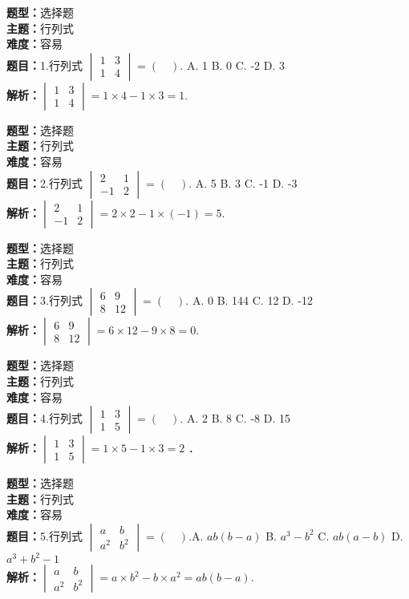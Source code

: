 \documentclass{ctexart}
\newenvironment{question}[5]{%
	\noindent\textbf{题型：}#1\\
	\textbf{主题：}#2\\
	\textbf{难度：}#3\\
	\textbf{题目：}#4\\
	\textbf{解析：}#5\\
	\vspace{1em}
}{}
\begin{document}
	\begin{question}
		{选择题}
		{行列式}
		{容易}
		{1.行列式 \(\begin{vmatrix} 1 & 3 \\ 1 & 4\end{vmatrix}=(\quad).\)
			A. 1 \quad B. 0 \quad C. -2 \quad D. 3}
		{\(\begin{vmatrix} 1 & 3 \\ 1 & 4\end{vmatrix}=1 \times 4-1 \times 3=1. \)}
	\end{question}
	
	\begin{question}
		{选择题}
		{行列式}
		{容易}
		{2.行列式 \(\begin{vmatrix}2 & 1 \\ -1 & 2\end{vmatrix}=(\quad).\)
			A. 5 \quad B. 3	\quad C. -1 \quad D. -3 }
		{\(\begin{vmatrix}2 & 1 \\ -1 & 2\end{vmatrix}=2 \times 2-1 \times(-1)=5.\) }
	\end{question}
	
	\begin{question}
		{选择题}
		{行列式}
		{容易}
		{3.行列式 \(\begin{vmatrix} 6 & 9 \\ 8 & 12\end{vmatrix}=( \quad ). \)
			A. 0 \quad B. 144 \quad C. 12 \quad D. -12}
		{\(\begin{vmatrix} 6 & 9 \\ 8 & 12\end{vmatrix}=6 \times 12-9 \times 8=0. \)}
	\end{question}
	
	\begin{question}
		{选择题}
		{行列式}
		{容易}
		{4.行列式 \(\begin{vmatrix} 1 & 3 \\ 1 & 5\end{vmatrix}=( \quad ).\)
			A. 2  \quad B. 8  \quad C. -8	 \quad D. 15}
		{\(\begin{vmatrix} 1 & 3 \\ 1 & 5\end{vmatrix}=1 \times 5-1 \times 3=2\) ．}
	\end{question}
	
	\begin{question}
		{选择题}
		{行列式}
		{容易}
		{5.行列式 \(\begin{vmatrix} a & b \\ a^2 & b^2\end{vmatrix}=(\quad). \)A. \(a b(b-a)\) \quad B. \(a^3-b^2\) \quad C. \(a b(a-b)\) \quad D. \(a^3+b^2-1\)}
		{\(\begin{vmatrix} a & b \\ a^2 & b^2\end{vmatrix}=a \times b^2-b \times a^2=a b(b-a).\)}
	\end{question}
	
\end{document}
